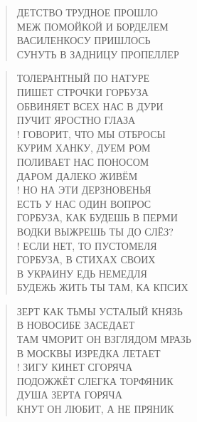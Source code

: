 \poemtitle{***}
\begin{verse}
ДЕТСТВО ТРУДНОЕ ПРОШЛО\\
МЕЖ ПОМОЙКОЙ И БОРДЕЛЕМ\\
ВАСИЛЕНКОСУ ПРИШЛОСЬ\\
СУНУТЬ В ЗАДНИЦУ ПРОПЕЛЛЕР
\end{verse}

\poemtitle{***}
\begin{verse}
ТОЛЕРАНТНЫЙ ПО НАТУРЕ\\
ПИШЕТ СТРОЧКИ ГОРБУЗА\\
ОБВИНЯЕТ ВСЕХ НАС В ДУРИ\\
ПУЧИТ ЯРОСТНО ГЛАЗА\\!
ГОВОРИТ, ЧТО МЫ ОТБРОСЫ\\
КУРИМ ХАНКУ, ДУЕМ РОМ\\
ПОЛИВАЕТ НАС ПОНОСОМ\\
ДАРОМ ДАЛЕКО ЖИВЁМ\\!
НО НА ЭТИ ДЕРЗНОВЕНЬЯ\\
ЕСТЬ У НАС ОДИН ВОПРОС\\
ГОРБУЗА, КАК БУДЕШЬ В ПЕРМИ\\
ВОДКИ ВЫЖРЕШЬ ТЫ ДО СЛЁЗ?\\!
ЕСЛИ НЕТ, ТО ПУСТОМЕЛЯ\\
ГОРБУЗА, В СТИХАХ СВОИХ\\
В УКРАИНУ ЕДЬ НЕМЕДЛЯ\\
БУДЕЖЬ ЖИТЬ ТЫ ТАМ, КА КПСИХ
\end{verse}

\poemtitle{***}
\begin{verse}
ЗЕРТ КАК ТЬМЫ УСТАЛЫЙ КНЯЗЬ\\
В  НОВОСИБЕ ЗАСЕДАЕТ\\
ТАМ ЧМОРИТ ОН ВЗГЛЯДОМ МРАЗЬ\\
В МОСКВЫ ИЗРЕДКА ЛЕТАЕТ\\!
ЗИГУ КИНЕТ СГОРЯЧА\\
ПОДОЖЖЁТ СЛЕГКА ТОРФЯНИК\\
ДУША ЗЕРТА ГОРЯЧА\\
КНУТ ОН ЛЮБИТ, А НЕ ПРЯНИК
\end{verse}

